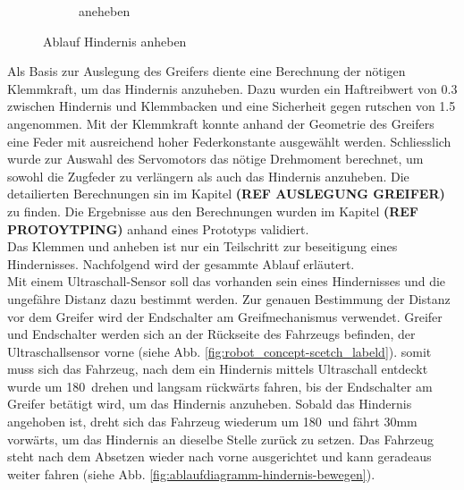 \begin{figure}[H]
\begin{subfigure}{0.55\textwidth}
\caption{aneheben}
\label{fig:gripper_lifting_side}
\end{subfigure}
\caption{Ablauf Hindernis anheben}
\label{fig:obstacle_gripping_process}
\end{figure}

 \newpage
 
Als Basis zur Auslegung des Greifers diente eine Berechnung der nötigen Klemmkraft, um das Hindernis anzuheben. Dazu wurden ein Haftreibwert von 0.3 zwischen Hindernis und Klemmbacken und eine Sicherheit gegen rutschen von 1.5 angenommen. Mit der Klemmkraft konnte anhand der Geometrie des Greifers eine Feder mit ausreichend hoher Federkonstante ausgewählt werden. Schliesslich wurde zur Auswahl des Servomotors das nötige Drehmoment berechnet, um sowohl die Zugfeder zu verlängern als auch das Hindernis anzuheben. Die detailierten Berechnungen sin im Kapitel \textbf{(REF AUSLEGUNG GREIFER)} zu finden. Die Ergebnisse aus den Berechnungen wurden im Kapitel \textbf{(REF PROTOYTPING)} anhand eines Prototyps validiert.\\

Das Klemmen und anheben ist nur ein Teilschritt  zur beseitigung eines Hindernisses. Nachfolgend wird der gesammte Ablauf erläutert.\\

 Mit einem Ultraschall-Sensor soll das vorhanden sein eines Hindernisses und die ungefähre Distanz dazu bestimmt werden. Zur genauen Bestimmung der Distanz vor dem Greifer wird der Endschalter am Greifmechanismus verwendet.
Greifer und Endschalter werden sich an der Rückseite des Fahrzeugs befinden, der Ultraschallsensor vorne (siehe Abb. \ref{fig:robot_concept-scetch_labeld}). somit muss sich das Fahrzeug, nach dem ein Hindernis mittels Ultraschall entdeckt wurde um 180\textdegree\ drehen und langsam rückwärts fahren, bis der Endschalter am Greifer betätigt wird, um das Hindernis anzuheben. Sobald das Hindernis angehoben ist, dreht sich das Fahrzeug wiederum um 180\textdegree\ und fährt 30mm vorwärts, um das Hindernis an dieselbe Stelle zurück zu setzen. Das Fahrzeug steht nach dem Absetzen wieder nach vorne ausgerichtet und kann geradeaus weiter fahren (siehe  Abb. \ref{fig:ablaufdiagramm-hindernis-bewegen}).


